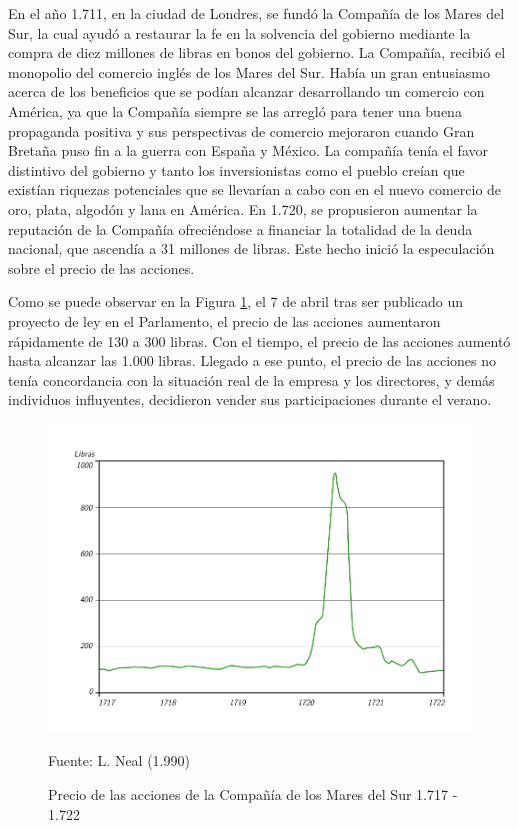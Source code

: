 En el año 1.711, en la ciudad de Londres, se fundó la Compañía de los Mares del Sur, la cual ayudó a restaurar la fe en la solvencia del gobierno mediante la compra de diez millones de libras en bonos del gobierno. La Compañía, recibió el monopolio del comercio inglés de los Mares del Sur. Había un gran entusiasmo acerca de los beneficios que se podían alcanzar desarrollando un comercio con América, ya que la Compañía siempre se las arregló para tener una buena propaganda positiva y sus perspectivas de comercio mejoraron cuando Gran Bretaña puso fin a la guerra con España y México. La compañía tenía el favor distintivo del gobierno y tanto los inversionistas como el pueblo creían que existían riquezas potenciales que se llevarían a cabo con en el nuevo comercio de oro, plata, algodón y lana en América. En 1.720, se propusieron aumentar la reputación de la Compañía ofreciéndose a financiar la totalidad de la deuda nacional, que ascendía a 31 millones de libras. Este hecho inició la especulación sobre el precio de las acciones. 

Como se puede observar en la Figura \ref{fig:PrecioAccionesMaresSur}, el 7 de abril tras ser publicado un proyecto de ley en el Parlamento, el precio de las acciones aumentaron rápidamente de 130 a 300 libras. Con el tiempo, el precio de las acciones aumentó hasta alcanzar las 1.000 libras. Llegado a ese punto, el precio de las acciones no tenía concordancia con la situación real de la empresa y los directores, y demás individuos influyentes, decidieron vender sus participaciones durante el verano.

\begin{figure}[!h] 
\caption{Precio de las acciones de la Compañía de los Mares del Sur 1.717 - 1.722} 
\centering \includegraphics[width=150mm]{capitulos/graficos/SouthSeaStockPrice} 
\label{fig:PrecioAccionesMaresSur} 

	\footnotesize
	Fuente: L. Neal (1.990)

\end{figure}

